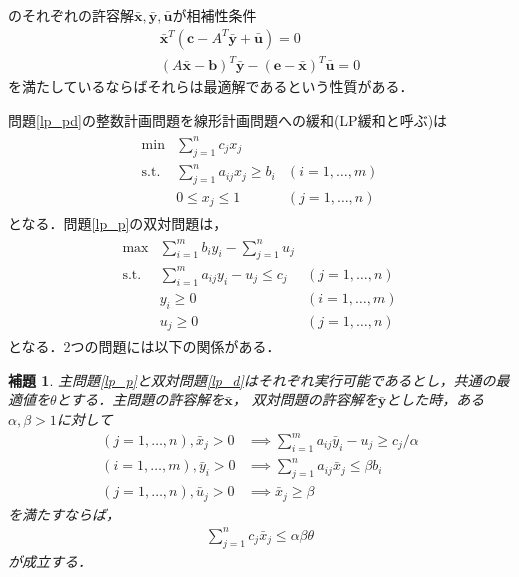 \documentclass[11pt,dvipdfmx]{jarticle}
\numberwithin{equation}{section}
\newtheorem{lem}{補題}[section]
\begin{document}
        のそれぞれの許容解$\bar{\bm{x}},\bar{\bm{y}},\bar{\bm{u}}$が相補性条件
        \begin{align}
            \bar{\bm{x}}^T(\bm{c}-A^T\bar{\bm{y}}+\bar{\bm{u}})=0\\
            (A\bar{\bm{x}}-\bm{b})^T\bar{\bm{y}}-(\bm{e}-\bar{\bm{x}})^T\bar{\bm{u}}=0
        \end{align}
        を満たしているならばそれらは最適解であるという性質がある\cite{meityo}．\par
        問題\eqref{lp_pd}の整数計画問題を線形計画問題への緩和(LP緩和と呼ぶ)は
        \begin{align} 
            \begin{array}{cll}
                \mathrm{min } & \displaystyle\sum_{j = 1}^{n}{c_jx_j} & \\
                \mathrm{s.t.} & \displaystyle\sum_{j=1}^{n}{a_{ij}x_j} \ge b_i & (i = 1,\dotsc,m)\\
                                & 0 \le x_j \le 1 & (j=1,\dotsc,n) 
            \end{array}
            \label{lp_p}
        \end{align}
        となる．問題\eqref{lp_p}の双対問題は，
        \begin{align}
            \begin{array}{cll}
                \mathrm{max } & \displaystyle\sum_{i = 1}^{m}{b_iy_i}-\sum_{j=1}^{n}{u_j} & \\
                \mathrm{s.t.} & \displaystyle\sum_{i=1}^{m}{a_{ij}y_i}-u_j \le c_j & (j = 1,\dotsc,n)\\
                              & y_i \ge 0 & (i = 1,\dotsc,m)\\
                              & u_j \ge 0 & (j = 1,\dotsc, n) 
            \end{array}
            \label{lp_d}
        \end{align}
        となる．2つの問題には以下の関係がある．
        \begin{lem}
            主問題\eqref{lp_p}と双対問題\eqref{lp_d}はそれぞれ実行可能であるとし，共通の最適値を$\theta$とする．主問題の許容解を$\bar{\bm{x}}$，
            双対問題の許容解を$\bar{\bm{y}}$とした時，ある$\alpha,\beta>1$に対して
            \begin{subequations}
                \begin{align}
                    (j = 1, \dotsc, n), \bar{x}_j>0 &\implies \sum_{i=1}^{m}{a_{ij}\bar{y}_i}-u_j \ge c_j/\alpha \label{pd_1}\\
                    (i = 1, \dotsc, m), \bar{y}_i>0 &\implies \sum_{j=1}^{n}{a_{ij}\bar{x}_j} \le \beta b_i \label{pd_2}\\
                    (j = 1, \dotsc, n), \bar{u}_j>0 &\implies \bar{x}_j \ge \beta \label{pd_3}
                \end{align}
            \end{subequations}
            を満たすならば，
            \begin{align}
                \sum_{j = 1}^{n}{c_j\bar{x}_j} \le \alpha\beta\theta \label{pd_ans}
            \end{align}
            が成立する．
            \label{lem_pd}
        \end{lem}
\end{document}

